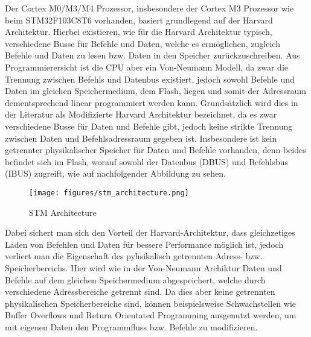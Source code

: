 \documentclass[a4paper,
DIV=13,
12pt,
BCOR=10mm,
department=FakIM,
oneside,
parskip=half,
automark,
listof=totocnumbered,
bibliography=totocnumbered,
acronym=totocnumbered
] {OTHRartcl}
\begin{document}
Der Cortex M0/M3/M4 Prozessor, insbesondere der Cortex M3 Prozessor wie beim STM32F103C8T6 vorhanden, basiert grundlegend auf der Harvard Architektur.
Hierbei existieren, wie für die Harvard Architektur typisch, verschiedene Busse für Befehle und Daten, welche es ermöglichen, zugleich Befehle und Daten zu lesen bzw. Daten in den Speicher zurückzuschreiben.
Aus Programmierersicht ist die CPU aber ein Von-Neumann Modell, da zwar die Trennung zwischen Befehls und Datenbus existiert, jedoch sowohl Befehle und Daten im gleichen Speichermedium, dem Flash, liegen und
somit der Adressraum dementsprechend linear programmiert werden kann.
Grundsätzlich wird dies in der Literatur als Modifizierte Harvard Architektur bezeichnet, da es zwar verschiedene Busse für Daten und Befehle gibt, jedoch keine strikte Trennung zwischen Daten und Befehlsadressraum gegeben ist.
Insbesondere ist kein getrennter physikalischer Speicher für Daten und Befehle vorhanden, denn beides befindet sich im Flash, worauf sowohl der Datenbus (DBUS) und Befehlsbus (IBUS) zugreift, wie auf
nachfolgender Abbildung zu sehen.
\begin{figure}[ht!]
  \begin{center}
    \texttt{[image: figures/stm\_architecture.png]}
    \caption{STM Architecture}
    \label{fig: STM Architektur}
  \end{center}
\end{figure}
Dabei sichert man sich den Vorteil der Harvard-Architektur, dass gleichzetiges Laden von Befehlen und Daten für bessere Performance möglich ist, jedoch
verliert man die Eigenschaft des pyhsikalisch getrennten Adress- bzw. Speicherbereichs. Hier wird wie in der Von-Neumann Archiktur Daten und Befehle auf dem gleichen Speichermedium abgespeichert, welche durch verschiedene Adressbereiche getrennt sind. Da dies aber keine getrennten physikalischen Speicherbereiche sind, können beispielsweise Schwachstellen wie Buffer Overflows und Return Orientated Programming ausgenutzt werden, um mit eigenen Daten den Programmfluss bzw. Befehle zu modifizieren.
\end{document}

